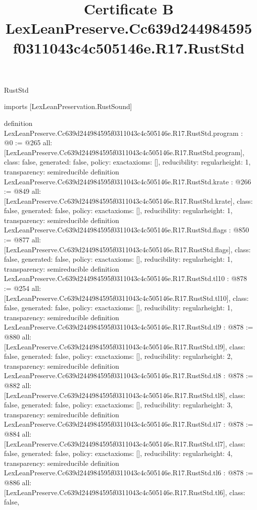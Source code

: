 \begin{lexlean}{RustStd}
\title{Certificate B LexLeanPreserve.Cc639d244984595f0311043c4c505146e.R17.RustStd}
\begin{coremodule}
imports [LexLeanPreservation.RustSound]

definition LexLeanPreserve.Cc639d244984595f0311043c4c505146e.R17.RustStd.program : @0 := @265 {
  all: [LexLeanPreserve.Cc639d244984595f0311043c4c505146e.R17.RustStd.program],
  class: false,
  generated: false,
  policy: exact{axioms: []},
  reducibility: regular{height: 1},
  transparency: semireducible
}
definition LexLeanPreserve.Cc639d244984595f0311043c4c505146e.R17.RustStd.krate : @266 := @849 {
  all: [LexLeanPreserve.Cc639d244984595f0311043c4c505146e.R17.RustStd.krate],
  class: false,
  generated: false,
  policy: exact{axioms: []},
  reducibility: regular{height: 1},
  transparency: semireducible
}
definition LexLeanPreserve.Cc639d244984595f0311043c4c505146e.R17.RustStd.flags : @850 := @877 {
  all: [LexLeanPreserve.Cc639d244984595f0311043c4c505146e.R17.RustStd.flags],
  class: false,
  generated: false,
  policy: exact{axioms: []},
  reducibility: regular{height: 1},
  transparency: semireducible
}
definition LexLeanPreserve.Cc639d244984595f0311043c4c505146e.R17.RustStd.tl10 : @878 := @254 {
  all: [LexLeanPreserve.Cc639d244984595f0311043c4c505146e.R17.RustStd.tl10],
  class: false,
  generated: false,
  policy: exact{axioms: []},
  reducibility: regular{height: 1},
  transparency: semireducible
}
definition LexLeanPreserve.Cc639d244984595f0311043c4c505146e.R17.RustStd.tl9 : @878 := @880 {
  all: [LexLeanPreserve.Cc639d244984595f0311043c4c505146e.R17.RustStd.tl9],
  class: false,
  generated: false,
  policy: exact{axioms: []},
  reducibility: regular{height: 2},
  transparency: semireducible
}
definition LexLeanPreserve.Cc639d244984595f0311043c4c505146e.R17.RustStd.tl8 : @878 := @882 {
  all: [LexLeanPreserve.Cc639d244984595f0311043c4c505146e.R17.RustStd.tl8],
  class: false,
  generated: false,
  policy: exact{axioms: []},
  reducibility: regular{height: 3},
  transparency: semireducible
}
definition LexLeanPreserve.Cc639d244984595f0311043c4c505146e.R17.RustStd.tl7 : @878 := @884 {
  all: [LexLeanPreserve.Cc639d244984595f0311043c4c505146e.R17.RustStd.tl7],
  class: false,
  generated: false,
  policy: exact{axioms: []},
  reducibility: regular{height: 4},
  transparency: semireducible
}
definition LexLeanPreserve.Cc639d244984595f0311043c4c505146e.R17.RustStd.tl6 : @878 := @886 {
  all: [LexLeanPreserve.Cc639d244984595f0311043c4c505146e.R17.RustStd.tl6],
  class: false,
}
\end{coremodule}
\end{lexlean}
